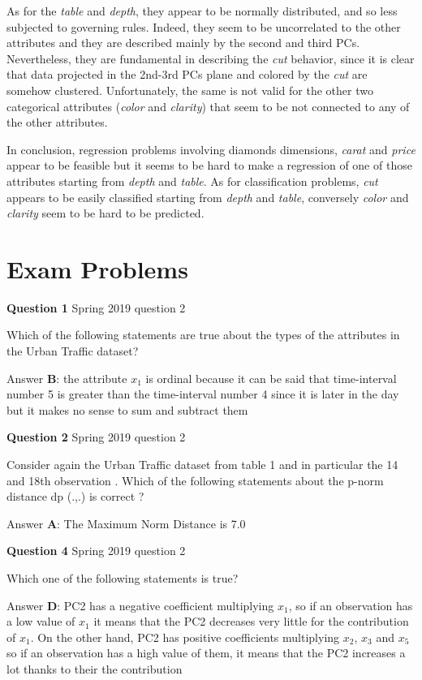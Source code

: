 \documentclass[
]{article}
\begin{document}
As for the \emph{table} and \emph{depth}, they appear to be normally
distributed, and so less subjected to governing rules. Indeed, they seem
to be uncorrelated to the other attributes and they are described mainly
by the second and third PCs. Nevertheless, they are fundamental in
describing the \emph{cut} behavior, since it is clear that data
projected in the 2nd-3rd PCs plane and colored by the \emph{cut} are
somehow clustered. Unfortunately, the same is not valid for the other
two categorical attributes (\emph{color} and \emph{clarity}) that seem
to be not connected to any of the other attributes.

In conclusion, regression problems involving diamonds dimensions,
\emph{carat} and \emph{price} appear to be feasible but it seems to be
hard to make a regression of one of those attributes starting from
\emph{depth} and \emph{table}. As for classification problems,
\emph{cut} appears to be easily classified starting from \emph{depth}
and \emph{table}, conversely \emph{color} and \emph{clarity} seem to be
hard to be predicted.

\newpage

\section{Exam Problems}\label{exam-problems}

\textbf{Question 1} \textbar{} Spring 2019 question 2

Which of the following statements are true about the types of the
attributes in the Urban Traffic dataset?

Answer \textbf{B}: the attribute \(x_1\) is ordinal because it can be
said that time-interval number 5 is greater than the time-interval
number 4 since it is later in the day but it makes no sense to sum and
subtract them

\textbf{Question 2} \textbar{} Spring 2019 question 2

Consider again the Urban Traffic dataset from table 1 and in particular
the 14 and 18th observation . Which of the following statements about
the p-norm distance dp (.,.) is correct ?

Answer \textbf{A}: The Maximum Norm Distance is 7.0

\textbf{Question 4} \textbar{} Spring 2019 question 2

Which one of the following statements is true?

Answer \textbf{D}: PC2 has a negative coefficient multiplying \(x_1\),
so if an observation has a low value of \(x_1\) it means that the PC2
decreases very little for the contribution of \(x_1\). On the other
hand, PC2 has positive coefficients multiplying \(x_2\), \(x_3\) and
\(x_5\) so if an observation has a high value of them, it means that the
PC2 increases a lot thanks to their the contribution
\end{document}
